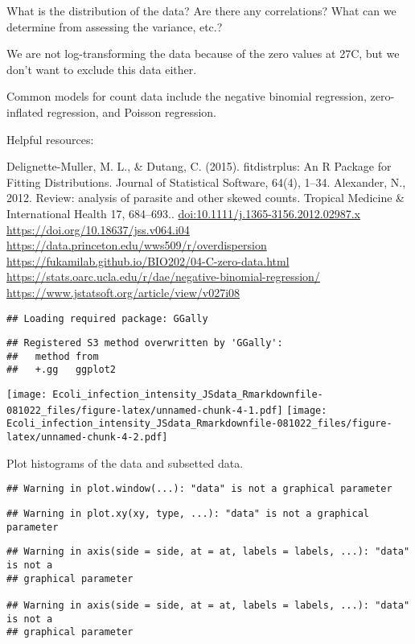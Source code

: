 \documentclass[
]{article}
\begin{document}
What is the distribution of the data? Are there any correlations? What
can we determine from assessing the variance, etc.?

We are not log-transforming the data because of the zero values at 27C,
but we don't want to exclude this data either.

Common models for count data include the negative binomial regression,
zero-inflated regression, and Poisson regression.

Helpful resources:

Delignette-Muller, M. L., \& Dutang, C. (2015). fitdistrplus: An R
Package for Fitting Distributions. Journal of Statistical Software,
64(4), 1--34. Alexander, N., 2012. Review: analysis of parasite and
other skewed counts. Tropical Medicine \& International Health 17,
684--693.. \url{doi:10.1111/j.1365-3156.2012.02987.x}
\url{https://doi.org/10.18637/jss.v064.i04}
\url{https://data.princeton.edu/wws509/r/overdispersion}
\url{https://fukamilab.github.io/BIO202/04-C-zero-data.html}
\url{https://stats.oarc.ucla.edu/r/dae/negative-binomial-regression/}
\url{https://www.jstatsoft.org/article/view/v027i08}

\begin{verbatim}
## Loading required package: GGally
\end{verbatim}

\begin{verbatim}
## Registered S3 method overwritten by 'GGally':
##   method from   
##   +.gg   ggplot2
\end{verbatim}

\texttt{[image: Ecoli\_infection\_intensity\_JSdata\_Rmarkdownfile-081022\_files/figure-latex/unnamed-chunk-4-1.pdf]}
\texttt{[image: Ecoli\_infection\_intensity\_JSdata\_Rmarkdownfile-081022\_files/figure-latex/unnamed-chunk-4-2.pdf]}

Plot histograms of the data and subsetted data.

\begin{verbatim}
## Warning in plot.window(...): "data" is not a graphical parameter
\end{verbatim}

\begin{verbatim}
## Warning in plot.xy(xy, type, ...): "data" is not a graphical parameter
\end{verbatim}

\begin{verbatim}
## Warning in axis(side = side, at = at, labels = labels, ...): "data" is not a
## graphical parameter

## Warning in axis(side = side, at = at, labels = labels, ...): "data" is not a
## graphical parameter
\end{verbatim}
\end{document}
